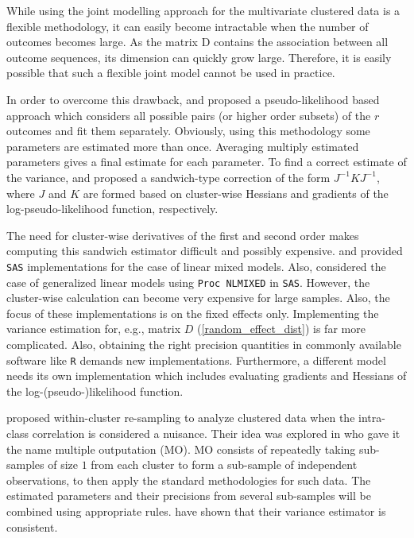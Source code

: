 \documentclass[11pt,a5paper,twoside]{book}
\begin{document}
While using the joint modelling approach for the multivariate clustered data is a flexible methodology, it can easily become intractable when the number of outcomes becomes large. As the matrix D contains the association between all outcome sequences, its dimension can quickly grow large. Therefore, it is easily possible that such a flexible joint model cannot be used in practice. 

In order to overcome this drawback, \cite{Verbeke2006} and \cite{Verbeke2007} proposed a pseudo-likelihood based approach which considers all possible pairs (or higher order subsets) of the $r$ outcomes and fit them separately. Obviously, using this methodology some parameters are estimated more than once. Averaging multiply estimated parameters gives a final estimate for each parameter. To find a correct estimate of the variance, \cite{Verbeke2006} and \cite{Verbeke2007} proposed a sandwich-type correction of the form $J^{-1}KJ^{-1}$, where $J$ and $K$ are formed based on cluster-wise Hessians and gradients of the log-pseudo-likelihood function, respectively. 

The need for cluster-wise derivatives of the first and second order makes computing this sandwich estimator difficult and possibly expensive. \cite{pair_lin} and \cite{kundu} provided {\tt{SAS}} implementations for the case of linear mixed models. Also, \cite{pair_gen} considered the case of generalized linear models using {\tt{Proc NLMIXED}} in {\tt{SAS}}. However, the cluster-wise calculation can become very expensive for large samples. Also, the focus of these implementations is on the fixed effects only. Implementing the variance estimation for, e.g., matrix $D$ (\ref{random_effect_dist}) is far more complicated. Also, obtaining the right precision quantities in commonly available software like {\tt{R}} demands new implementations. Furthermore, a different model needs its own implementation which includes evaluating gradients and Hessians of the log-(pseudo-)likelihood function. 

\cite{hoffman2001} proposed within-cluster re-sampling to analyze clustered data when the intra-class correlation is considered a nuisance. Their idea was explored in \cite{follmann2003} who gave it the name multiple outputation (MO). MO consists of repeatedly taking sub-samples of size $1$ from each cluster to form a sub-sample of independent observations, to then apply the standard methodologies for such data. The estimated parameters  and their precisions from several sub-samples will be combined using appropriate rules. \cite{hoffman2001} have shown that their variance estimator is consistent.
\end{document}
